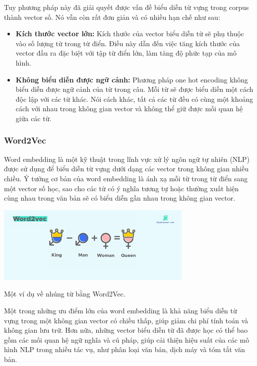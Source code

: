 \documentclass[a4paper, 12pt, openany]{book}
\begin{document}
Tuy phương pháp này đã giải quyết được vấn đề biểu diễn từ vựng trong corpus thành 
vector số. Nó vẫn còn rất đơn giản và có nhiều hạn chế như sau:

\begin{itemize}
    \item \textbf{Kích thước vector lớn:} Kích thước của vector biểu diễn từ sẽ phụ thuộc vào số lượng từ trong từ điển. Điều này dẫn đến việc tăng kích thước của vector đầu ra đặc biệt với tập từ điển lớn, làm tăng độ phức tạp của mô hình.
    \item \textbf{Không biểu diễn được ngữ cảnh:} Phương pháp one hot encoding không biểu diễn được ngữ cảnh của từ trong câu. Mỗi từ sẽ được biểu diễn một cách độc lập với các từ khác.
    Nói cách khác, tất cả các từ đều có cùng một khoảng cách với nhau trong không gian vector và không thể giữ được mối quan hệ giữa các từ.
\end{itemize}

\subsubsection{Word2Vec}
Word embedding là một kỹ thuật trong lĩnh vực xử lý ngôn ngữ tự nhiên (NLP) được sử dụng để biểu diễn từ vựng dưới dạng các vector trong không gian nhiều chiều. Ý tưởng cơ bản của word embedding là ánh xạ mỗi từ trong từ điển sang một vector số học, sao cho các từ có ý nghĩa tương tự hoặc thường xuất hiện cùng nhau trong văn bản sẽ có biểu diễn gần nhau trong không gian vector.

\begin{minipage}{\linewidth}
    \captionsetup{type=figure}
    \centering
    \includegraphics[width=.8\linewidth]{./assets/images/word2vec-intro.png}
    \caption{Một ví dụ về nhúng từ bằng Word2Vec.}
\end{minipage}
\vspace{0.5cm}

Một trong những ưu điểm lớn của word embedding là khả năng biểu diễn từ vựng trong một không gian vector có chiều thấp, giúp giảm chi phí tính toán và không gian lưu trữ. Hơn nữa, những vector biểu diễn từ đã được học có thể bao gồm các mối quan hệ ngữ nghĩa và cú pháp, giúp cải thiện hiệu suất của các mô hình NLP trong nhiều tác vụ, như phân loại văn bản, dịch máy và tóm tắt văn bản.
\end{document}
